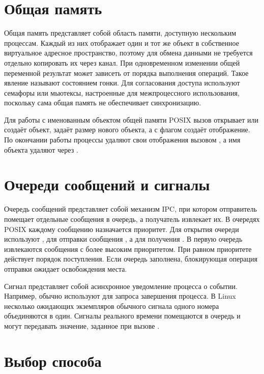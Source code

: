 \section{Общая память}

Общая память представляет собой область памяти, доступную нескольким процессам. Каждый из них отображает один и тот же объект в собственное виртуальное адресное пространство, поэтому для обмена данными не требуется отдельно копировать их через канал. При одновременном изменении общей переменной результат может зависеть от порядка выполнения операций. Такое явление называют состоянием гонки. Для согласования доступа используют семафоры или мьютексы, настроенные для межпроцессного использования, поскольку сама общая память не обеспечивает синхронизацию.

Для работы с именованным объектом общей памяти POSIX вызов  открывает или создаёт объект,  задаёт размер нового объекта, а  с флагом  создаёт отображение. По окончании работы процессы удаляют свои отображения вызовом , а имя объекта удаляют через .

\section{Очереди сообщений и сигналы}

Очередь сообщений представляет собой механизм IPC, при котором отправитель помещает отдельные сообщения в очередь, а получатель извлекает их. В очередях POSIX каждому сообщению назначается приоритет. Для открытия очереди используют , для отправки сообщения , а для получения . В первую очередь извлекаются сообщения с более высоким приоритетом. При равном приоритете действует порядок поступления. Если очередь заполнена, блокирующая операция отправки ожидает освобождения места.

Сигнал представляет собой асинхронное уведомление процесса о событии. Например,  обычно используют для запроса завершения процесса. В Linux несколько ожидающих экземпляров обычного сигнала одного номера объединяются в один. Сигналы реального времени помещаются в очередь и могут передавать значение, заданное при вызове .

\section{Выбор способа}

